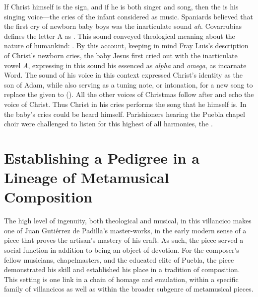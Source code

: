 If Christ himself is the sign, and if he is both singer and song, then the
 is his singing voice---the cries of the infant considered as
music.
Spaniards believed that the first cry of newborn baby boys was the inarticulate
sound \emph{ah}.
Covarrubias defines the letter A as .%
    \Autocites[]{Covarrubias:Tesoro}
This sound conveyed theological meaning about the nature of humankind:
.%
    \Autocites[]{Covarrubias:Tesoro}
By this account, keeping in mind Fray Luis's description of Christ's newborn
cries, the baby Jesus first cried out with the inarticulate vowel \emph{A},
expressing in this sound his essenced as \emph{alpha} and \emph{omega}, as
incarnate Word.
The sound of his voice in this context expressed Christ's identity as the son
of Adam, while also serving as a tuning note, or intonation, for a new song to
replace the  given to 
().
All the other voices of Christmas follow after and echo the voice of Christ.
Thus Christ in his cries performs the song that he himself is.
In the baby's cries could be heard  himself.
Parishioners hearing the Puebla chapel choir were challenged to listen for this
highest of all harmonies, the .

\section{Establishing a Pedigree in a Lineage of Metamusical Composition}

The high level of ingenuity, both theological and musical, in this villancico
makes  one of Juan Gutiérrez de Padilla's
master-works, in the early modern sense of a piece that proves the artisan's
mastery of his craft.
As such, the piece served a social function in addition to being an object of
devotion.
For the composer's fellow musicians, chapelmasters, and the educated elite of
Puebla, the piece demonstrated his skill and established his place in a
tradition of composition.
This setting is one link in a chain of homage and emulation, within a specific
family of villancicos as well as within the broader subgenre of metamusical
pieces.

